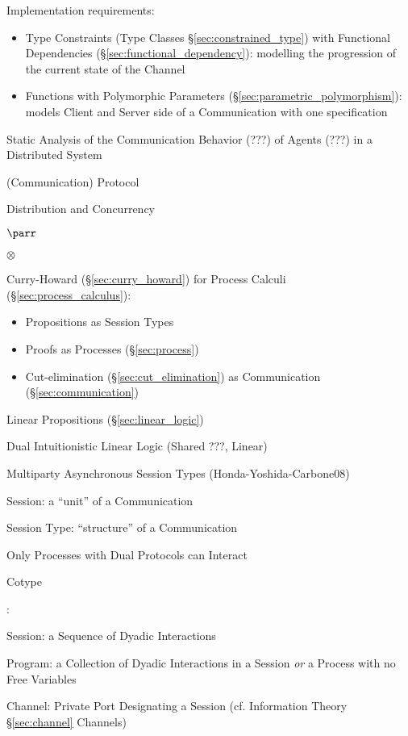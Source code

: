 Implementation requirements: \cite{neubauer-thiemann04}
\begin{itemize}
  \item Type Constraints (Type Classes \S\ref{sec:constrained_type})
    with Functional Dependencies (\S\ref{sec:functional_dependency}):
    modelling the progression of the current state of the Channel
  \item Functions with Polymorphic Parameters
    (\S\ref{sec:parametric_polymorphism}): models Client and Server
    side of a Communication with one specification
\end{itemize}

Static Analysis of the Communication Behavior (???) of Agents (???) in
a Distributed System \cite{gay-vasconcelos10}

(Communication) Protocol

Distribution and Concurrency

$\parr$

$\otimes$

Curry-Howard (\S\ref{sec:curry_howard}) for Process Calculi
(\S\ref{sec:process_calculus}):
\begin{itemize}
  \item Propositions as Session Types
  \item Proofs as Processes (\S\ref{sec:process})
  \item Cut-elimination (\S\ref{sec:cut_elimination}) as Communication
    (\S\ref{sec:communication})
\end{itemize}

Linear Propositions (\S\ref{sec:linear_logic})

Dual Intuitionistic Linear Logic \cite{caires-pfenning10} (Shared ???,
Linear)

Multiparty Asynchronous Session Types (Honda-Yoshida-Carbone08)

Session: a ``unit'' of a Communication

Session Type: ``structure'' of a Communication

Only Processes with Dual Protocols can Interact

Cotype


\cite{honda-vasconcelos-kubo98}:

Session: a Sequence of Dyadic Interactions

Program: a Collection of Dyadic Interactions in a Session \emph{or} a
Process with no Free Variables %

Channel: Private Port Designating a Session (cf. Information Theory
\S\ref{sec:channel} Channels)

